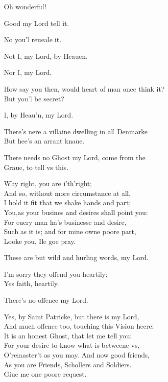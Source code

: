 \documentclass[a5paper,DIV=calc,11pt]{scrbook}
\begin{document}
\begin{drama*}
    \hamspeaks Oh wonderful!
    
    \horspeaks Good my Lord tell it.
    
    \hamspeaks No you'l reueale it.
    
    \horspeaks Not I, my Lord, by Heauen.
    
    \marspeaks Nor I, my Lord.
    
    \hamspeaks How say you then, would heart of man once think it?\\
    But you'l be secret?
    
     I, by Heau'n, my Lord.
    
    \hamspeaks There's nere a villaine dwelling in all Denmarke\\
    But hee's an arrant knaue.
    
    \horspeaks There needs no Ghost my Lord, come from the\\
    Graue, to tell vs this.
    
    \hamspeaks Why right, you are i'th'right;\\
    And so, without more circumstance at all,\\
    I hold it fit that we shake hands and part;\\
    You,as your busines and desires shall point you:\\
    For euery man ha's businesse and desire,\\
    Such as it is; and for mine owne poore part,\\
    Looke you, Ile goe pray.
    
    \horspeaks These are but wild and hurling words, my Lord.
    
    \hamspeaks I'm sorry they offend you heartily:\\
    Yes faith, heartily.
    
    \horspeaks There's no offence my Lord.
    
    \hamspeaks Yes, by Saint Patricke, but there is my Lord,\\
    And much offence too, touching this Vision heere:\\
    It is an honest Ghost, that let me tell you:\\
    For your desire to know what is betweene vs,\\
    O'remaster't as you may. And now good friends,\\
    As you are Friends, Schollers and Soldiers.\\
    Giue me one poore request.
    

\end{drama*}
\end{document}
